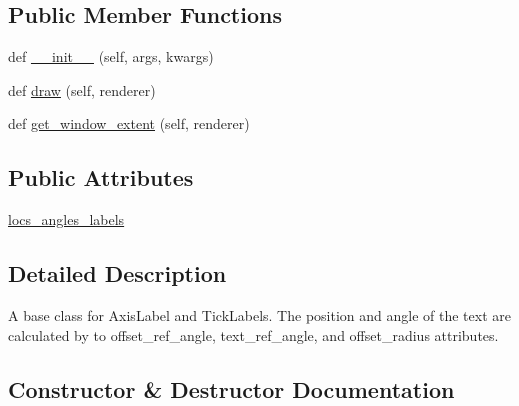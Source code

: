 \subsection*{Public Member Functions}
\begin{DoxyCompactItemize}
\item 
def \hyperlink{classaxisartist_1_1axis__artist_1_1LabelBase_a1e486fb8a77595165a352ba27c91adb6}{\+\_\+\+\_\+init\+\_\+\+\_\+} (self, args, kwargs)
\item 
def \hyperlink{classaxisartist_1_1axis__artist_1_1LabelBase_abcee0b2f1f799f7e2dde8a5a776dd4ca}{draw} (self, renderer)
\item 
def \hyperlink{classaxisartist_1_1axis__artist_1_1LabelBase_ac5d44a605287e02bbe04cbae84e8c54b}{get\+\_\+window\+\_\+extent} (self, renderer)
\end{DoxyCompactItemize}
\subsection*{Public Attributes}
\begin{DoxyCompactItemize}
\item 
\hyperlink{classaxisartist_1_1axis__artist_1_1LabelBase_a248e47dade66bd92b38eef037a4c58a1}{locs\+\_\+angles\+\_\+labels}
\end{DoxyCompactItemize}


\subsection{Detailed Description}
\begin{DoxyVerb}A base class for AxisLabel and TickLabels. The position and angle
of the text are calculated by to offset_ref_angle,
text_ref_angle, and offset_radius attributes.
\end{DoxyVerb}
 

\subsection{Constructor \& Destructor Documentation}
\mbox{\label{classaxisartist_1_1axis__artist_1_1LabelBase_a1e486fb8a77595165a352ba27c91adb6}} 
